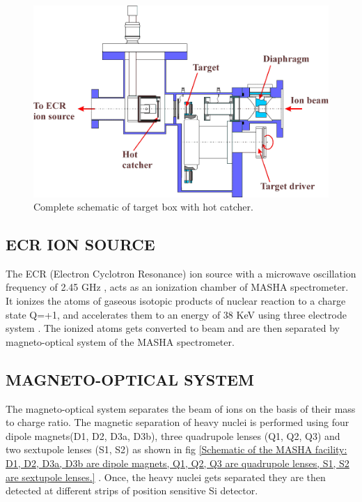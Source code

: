 \documentclass[12pt]{article}
\begin{document}
\begin{figure}[h]
\centering
\includegraphics[scale=0.7]{TBHC.png}
\caption{Complete schematic of target box with hot catcher.}
\label{Complete schematic of target box with hot catcher.}
\end{figure}

\subsection{ECR ION SOURCE}
The ECR (Electron Cyclotron Resonance) ion source with a microwave oscillation frequency of 2.45 GHz \cite{vedeneev2017current, mamatova2019study, rodin2014separation, rodin2014masha}, acts as an ionization chamber of MASHA spectrometer. It ionizes the atoms of gaseous isotopic products of nuclear reaction to a charge state Q=+1, and accelerates them to an energy of 38 KeV using three electrode system \cite{vedeneev2017current}. The ionized atoms gets converted to beam and are then separated by magneto-optical system of the MASHA spectrometer.

\subsection{MAGNETO-OPTICAL SYSTEM}
The magneto-optical system separates the beam of ions on the basis of their mass to charge ratio. The magnetic separation of heavy nuclei is performed using four dipole magnets(D1, D2, D3a, D3b), three quadrupole lenses (Q1, Q2, Q3) and two sextupole lenses (S1, S2) as shown in fig \ref{Schematic of the MASHA facility: D1, D2, D3a, D3b are dipole magnets, Q1, Q2, Q3 are quadrupole lenses, S1, S2 are sextupole lenses.} \cite{mamatova2019study}. Once, the heavy nuclei gets separated they are then detected at different strips of position sensitive Si detector.
\end{document}
